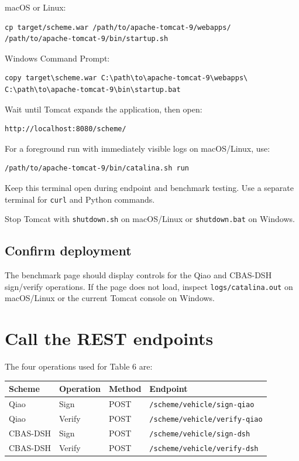 \documentclass[11pt,a4paper]{article}
\begin{document}
macOS or Linux:

\begin{lstlisting}[style=terminal]
cp target/scheme.war /path/to/apache-tomcat-9/webapps/
/path/to/apache-tomcat-9/bin/startup.sh
\end{lstlisting}

Windows Command Prompt:

\begin{lstlisting}[style=terminal]
copy target\scheme.war C:\path\to\apache-tomcat-9\webapps\
C:\path\to\apache-tomcat-9\bin\startup.bat
\end{lstlisting}

Wait until Tomcat expands the application, then open:

\begin{lstlisting}[style=terminal]
http://localhost:8080/scheme/
\end{lstlisting}

For a foreground run with immediately visible logs on macOS/Linux, use:

\begin{lstlisting}[style=terminal]
/path/to/apache-tomcat-9/bin/catalina.sh run
\end{lstlisting}

Keep this terminal open during endpoint and benchmark testing. Use a separate terminal for \texttt{curl} and Python commands.

Stop Tomcat with \texttt{shutdown.sh} on macOS/Linux or \texttt{shutdown.bat} on Windows.

\subsection{Confirm deployment}

The benchmark page should display controls for the Qiao and CBAS-DSH sign/verify operations. If the page does not load, inspect \texttt{logs/catalina.out} on macOS/Linux or the current Tomcat console on Windows.

\section{Call the REST endpoints}

The four operations used for Table 6 are:

\begin{tabularx}{\linewidth}{@{}lllX@{}}
\toprule
\textbf{Scheme} & \textbf{Operation} & \textbf{Method} & \textbf{Endpoint} \\
\midrule
Qiao & Sign & POST & \texttt{/scheme/vehicle/sign-qiao} \\
Qiao & Verify & POST & \texttt{/scheme/vehicle/verify-qiao} \\
CBAS-DSH & Sign & POST & \texttt{/scheme/vehicle/sign-dsh} \\
CBAS-DSH & Verify & POST & \texttt{/scheme/vehicle/verify-dsh} \\
\bottomrule
\end{tabularx}
\end{document}
